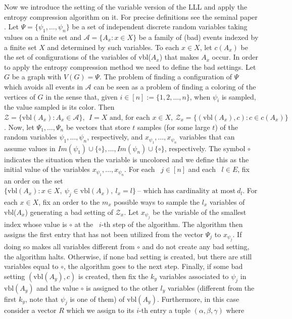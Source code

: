 \documentclass[11pt]{amsart}
\numberwithin{equation}{section}
\begin{document}
Now we introduce the setting of the variable version of the LLL and apply the entropy compression algorithm on it.  For precise definitions see the seminal paper \cite{MT}. Let $\Psi = \{\psi_1, \ldots, \psi_n\}$ be a set of independent discrete random variables taking values on a finite set and $\mathcal{A} = \{ A_x : x \in X \}$  be a family of (bad) events indexed by a finite set $X$ and  determined by such variables. To each $x \in X$, let $c(A_x)$ be the set of configurations of the variables of vbl($A_x$)  that makes $A_x$ occur. In order to apply the entropy compression method we need to define the bad settings. Let $G$ be a graph with $V(G) = \Psi$. The problem of finding a configuration of $\Psi$ which avoids all events in $\mathcal{A}$ can be seen as a problem of finding a coloring of the vertices of $G$ in the sense that, given $i \in [n] := \{1, 2, \dots, n\}$, when  $\psi_i$ is sampled, the value sampled is its color. Then 
$\mathcal{Z} = \{ \text{vbl}(A_x) : A_x \in \mathcal{A}\}, \ \ I = X \text{ and, for each } x \in X, \  \mathscr{Z}_x = \{ (\text{vbl}(A_x),c) : c \in c(A_x)\}$. Now, let $\Psi_1, \ldots, \Psi_n$  be vectors that store $t$ samples (for some large $t$) of the random variables $\psi_1, \ldots, \psi_n$, respectively, and $x_{\psi_1},\ldots, x_{\psi_n}$ variables that can assume values in $Im(\psi_1) \cup \{ \circ \}, \ldots, Im(\psi_n) \cup \{ \circ  \} $, respectively. The symbol $\circ$ indicates the situation when the variable is uncolored and we define this as the initial value of the variables $x_{\psi_1},\ldots, x_{\psi_n}$. For each~ $j \in [n]$ and each~ $l \in E$, fix an order on the set $\{ \text{vbl}(A_x) : x \in X, \ \psi_j \in \text{vbl}(A_x), \ l_x = l \}  \ \text{-- which has cardinality at most} \ d_l$. For each $x \in X$, fix an order to the $m_x$ possible ways to sample the $l_x$ variables of vbl($A_x$) generating a bad setting of $\mathscr{Z}_x$. Let $x_{\psi_j}$ be the variable of the smallest index whose value is $\circ$  at the~ $i$-th step of the algorithm. The algorithm then assigns the first entry that has not been utilized from the vector $\Psi_j$ to $x_{\psi_j}$. If doing so makes all variables different from $\circ$ and do not create any bad setting, the algorithm halts. Otherwise, if none bad setting is created, but there are still variables equal to $\circ$, the algorithm goes to the next step. Finally, if some bad setting $(\text{vbl}(A_y),c)$ is created, then fix the $k_y$ variables associated to $\psi_j$ in  $\text{vbl}(A_y)$ and the value $\circ$ is assigned to the  other $l_y$ variables (different from the first $k_y$, note that $\psi_j$ is one of them) of $\text{vbl}(A_y)$. Furthermore, in this case consider a vector $R$ which we assign to its $i$-th entry a tuple $(\alpha, \beta, \gamma)$ where 
\end{document}
